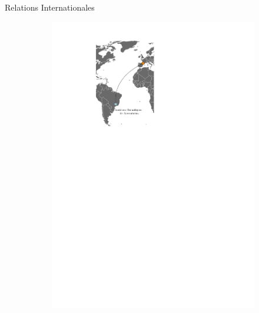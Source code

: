\documentclass[aspectratio=169, french]{beamer}
\begin{document}
\begin{frame}{Relations Internationales}
\begin{figure}[t]
\begin{subfigure}{0.4\textwidth}
			\includegraphics[width=.9\textwidth]{mappe_reseau_world.pdf} 
		\end{subfigure}
	\end{figure}
\end{frame}
\end{document}
